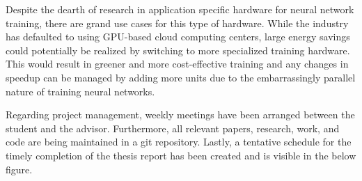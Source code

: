 \par 
Despite the dearth of research in application specific hardware for neural network training, there are grand use cases for this type of hardware. While the industry has defaulted to using GPU-based cloud computing centers, large energy savings could potentially be realized by switching to more specialized training hardware. This would result in greener and more cost-effective training and any changes in speedup can be managed by adding more units due to the embarrassingly parallel nature of training neural networks.
\par 
Regarding project management, weekly meetings have been arranged between the student and the advisor. Furthermore, all relevant papers, research, work, and code are being maintained in a git repository. Lastly, a tentative schedule for the timely completion of the thesis report has been created and is visible in the below figure.


